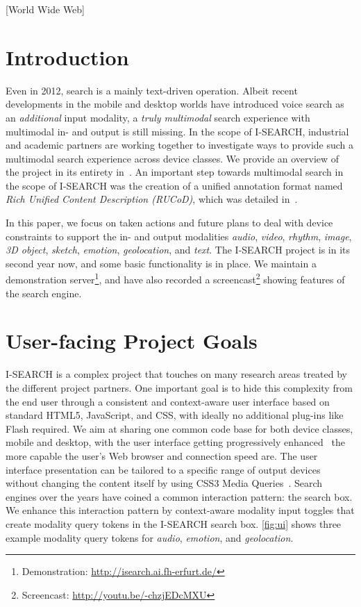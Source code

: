\documentclass{sig-alternate}
\let\oldemph\emph
\renewcommand{\emph}[1]{\oldemph{\fontsize{9}{9}\selectfont #1}}
\newcommand{\inlinelistingsize}{\fontsize{8pt}{11pt}}
\let\oldurl\url
\renewcommand{\url}[1]{\inlinelistingsize\oldurl{#1}}
\begin{document}
[World Wide Web]


\section{Introduction} \label{sec:introduction}
Even in 2012, search is a mainly text-driven operation.
Albeit recent developments in the mobile and desktop worlds have introduced voice search as an \emph{additional} input modality, a \emph{truly multimodal} search experience with multimodal in- and output is still missing.
In the scope of \mbox{I-SEARCH}, industrial and academic partners are working together to investigate ways to provide such a multimodal search experience across device classes.
We provide an overview of the project in its entirety in~\cite{www2012}.
An important step towards multimodal search in the scope of \mbox{I-SEARCH} was the creation of a unified annotation format named \emph{Rich Unified Content Description (RUCoD)}, which was detailed in~\cite{ijmis2010}.

In this paper, we focus on taken actions and future plans to deal with device constraints to support the in- and output modalities \emph{audio}, \emph{video}, \emph{rhythm}, \emph{image}, \emph{3D object}, \emph{sketch}, \emph{emotion}, \emph{geolocation}, and \emph{text}.
The \mbox{I-SEARCH} project is in its second year now, and some basic functionality is in place.
We maintain a demonstration server\footnote{Demonstration: \url{http://isearch.ai.fh-erfurt.de/}}, and have also recorded a screencast\footnote{Screencast: \url{http://youtu.be/-chzjEDcMXU}} showing features of the search engine.

\section{User-facing Project Goals} \label{sec:projectgoals}
\mbox{I-SEARCH} is a complex project that touches on many research areas treated by the different project partners.
One important goal is to hide this complexity from the end user through a consistent and context-aware user interface based on standard HTML5, JavaScript, and CSS, with ideally no additional plug-ins like Flash required.
We aim at sharing one common code base for both device classes, mobile and desktop, with the user interface getting progressively enhanced~\cite{progressiveenhancement} the more capable the user's Web browser and connection speed are.
The user interface presentation can be tailored to a specific range of output devices without changing the content itself by using CSS3 Media Queries~\cite{mediaqueries}.
Search engines over the years have coined a common interaction pattern: the search box.
We enhance this interaction pattern by context-aware modality input toggles that create modality query tokens in the \mbox{I-SEARCH} search box.
\autoref{fig:ui} shows three example modality query tokens for \emph{audio}, \emph{emotion}, and \emph{geolocation}.
\end{document}
